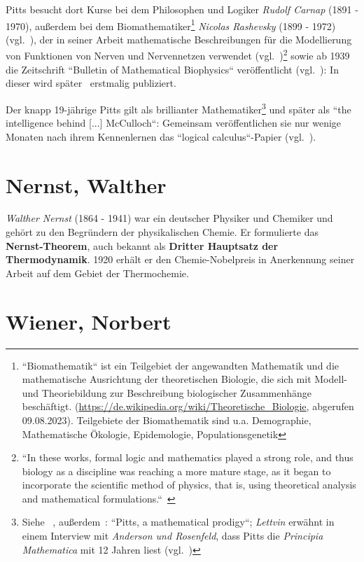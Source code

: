Pitts besucht dort Kurse bei dem Philosophen und Logiker \textit{Rudolf Carnap} (1891 - 1970), außerdem bei dem Biomathematiker\footnote{
    ``Biomathematik`` ist ein Teilgebiet der angewandten Mathematik und die mathematische Ausrichtung der theoretischen Biologie, die sich mit Modell- und Theoriebildung zur Beschreibung biologischer Zusammenhänge beschäftigt. ({\url{https://de.wikipedia.org/wiki/Theoretische\_Biologie}}, abgerufen 09.08.2023). Teilgebiete der Biomathematik sind u.a. Demographie, Mathematische Ökologie, Epidemologie, Populationsgenetik
} \textit{Nicolas Rashevsky} (1899 - 1972) (vgl.~\cite[184]{Pic04}), der in seiner Arbeit mathematische Beschreibungen für die Modellierung von Funktionen von Nerven und Nervennetzen verwendet (vgl.~\cite[13]{Abr02})\footnote{
    ``In these works, formal logic and mathematics played a strong role, and thus biology as a discipline was reaching a more mature stage, as it began to incorporate the scientific method of physics, that is, using theoretical analysis and mathematical formulations.``~\cite[7]{Abr02}
} sowie ab 1939 die Zeitschrift ``Bulletin of Mathematical Biophysics`` veröffentlicht (vgl.~\cite[16]{Abr02}): In dieser wird später~\cite{MP43} erstmalig publiziert.

Der knapp 19-jährige Pitts gilt als brillianter Mathematiker\footnote{
    Siehe ~\cite[4]{Arb19}, außerdem~\cite[22]{Abr02}: ``Pitts, a mathematical prodigy``;
    \textit{Lettvin} erwähnt in einem Interview mit \textit{Anderson und Rosenfeld}, dass Pitts die \textit{Principia Mathematica} mit 12 Jahren liest (vgl.~\cite[2]{AR98})
} und später als ``the intelligence behind [...] McCulloch``: Gemeinsam veröffentlichen sie nur wenige Monaten nach ihrem Kennenlernen das ``logical calculus``-Papier (vgl.~\cite[104]{AR98}).


\section{Nernst, Walther}\label{appendix:nernst}
\textit{Walther Nernst} (1864 - 1941) war ein deutscher Physiker und Chemiker und gehört zu den Begründern der physikalischen Chemie.
Er formulierte das \textbf{Nernst-Theorem}, auch bekannt als \textbf{Dritter Hauptsatz der Thermodynamik}.
1920 erhält er den Chemie-Nobelpreis in Anerkennung seiner Arbeit auf dem Gebiet der Thermochemie.




\section{Wiener, Norbert}\label{appendix:wiener}

